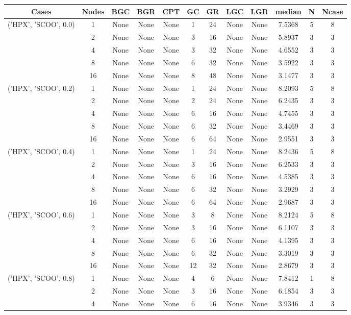\begin{tabular}{cccccccccccc}
\hline
Cases & Nodes& BGC& BGR& CPT& GC& GR& LGC& LGR& median & N & Ncase \\
\hline
\multirow{5}{*}{('HPX', 'SCOO', 0.0)}& 1& None& None& None& 1& 24& None& None& 7.5368& 5& 8\\
& 2& None& None& None& 3& 16& None& None& 5.8937& 3& 3\\
& 4& None& None& None& 3& 32& None& None& 4.6552& 3& 3\\
& 8& None& None& None& 6& 32& None& None& 3.5922& 3& 3\\
& 16& None& None& None& 8& 48& None& None& 3.1477& 3& 3\\
\hline
\multirow{5}{*}{('HPX', 'SCOO', 0.2)}& 1& None& None& None& 1& 24& None& None& 8.2093& 5& 8\\
& 2& None& None& None& 2& 24& None& None& 6.2435& 3& 3\\
& 4& None& None& None& 6& 16& None& None& 4.7455& 3& 3\\
& 8& None& None& None& 6& 32& None& None& 3.4469& 3& 3\\
& 16& None& None& None& 6& 64& None& None& 2.9551& 3& 3\\
\hline
\multirow{5}{*}{('HPX', 'SCOO', 0.4)}& 1& None& None& None& 1& 24& None& None& 8.2436& 5& 8\\
& 2& None& None& None& 3& 16& None& None& 6.2533& 3& 3\\
& 4& None& None& None& 6& 16& None& None& 4.5385& 3& 3\\
& 8& None& None& None& 6& 32& None& None& 3.2929& 3& 3\\
& 16& None& None& None& 6& 64& None& None& 2.9687& 3& 3\\
\hline
\multirow{5}{*}{('HPX', 'SCOO', 0.6)}& 1& None& None& None& 3& 8& None& None& 8.2124& 5& 8\\
& 2& None& None& None& 3& 16& None& None& 6.1107& 3& 3\\
& 4& None& None& None& 6& 16& None& None& 4.1395& 3& 3\\
& 8& None& None& None& 6& 32& None& None& 3.3019& 3& 3\\
& 16& None& None& None& 12& 32& None& None& 2.8679& 3& 3\\
\hline
\multirow{5}{*}{('HPX', 'SCOO', 0.8)}& 1& None& None& None& 4& 6& None& None& 7.8412& 1& 8\\
& 2& None& None& None& 3& 16& None& None& 6.1854& 3& 3\\
& 4& None& None& None& 6& 16& None& None& 3.9346& 3& 3\\

\end{tabular}
